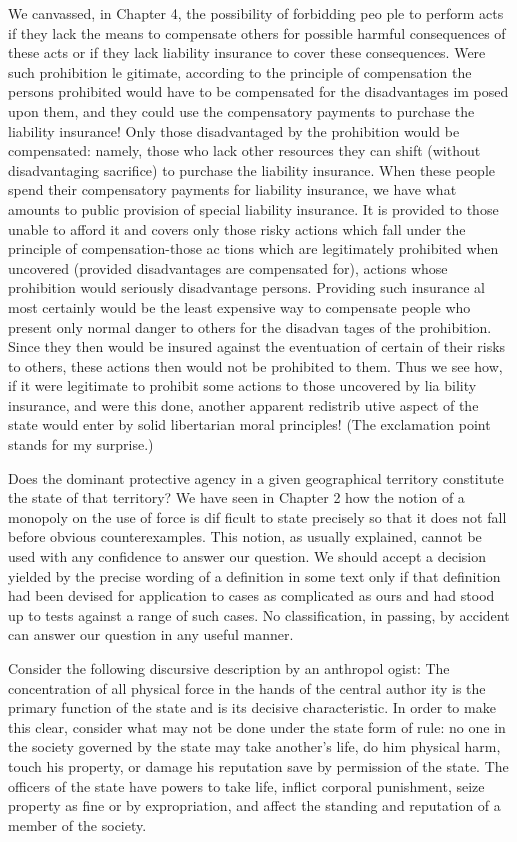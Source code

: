 \documentclass[11pt,openany]{book}
\begin{document}
We canvassed, in Chapter 4, the possibility of forbidding peo ple to perform acts if they lack the means to compensate others for possible harmful consequences of these acts or if they lack liability insurance to cover these consequences. Were such prohibition le gitimate, according to the principle of compensation the persons prohibited would have to be compensated for the disadvantages im posed upon them, and they could use the compensatory payments to purchase the liability insurance! Only those disadvantaged by the prohibition would be compensated: namely, those who lack other resources they can shift (without disadvantaging sacrifice) to purchase the liability insurance. When these people spend their compensatory payments for liability insurance, we have what amounts to public provision of special liability insurance. It is provided to those unable to afford it and covers only those risky actions which fall under the principle of compensation-those ac tions which are legitimately prohibited when uncovered (provided disadvantages are compensated for), actions whose prohibition would seriously disadvantage persons. Providing such insurance al most certainly would be the least expensive way to compensate people who present only normal danger to others for the disadvan tages of the prohibition. Since they then would be insured against the eventuation of certain of their risks to others, these actions then would not be prohibited to them. Thus we see how, if it were legitimate to prohibit some actions to those uncovered by lia bility insurance, and were this done, another apparent redistrib utive aspect of the state would enter by solid libertarian moral principles! (The exclamation point stands for my surprise.) 

Does the dominant protective agency in a given geographical territory constitute the state of that territory? We have seen in Chapter 2 how the notion of a monopoly on the use of force is dif ficult to state precisely so that it does not fall before obvious counterexamples. This notion, as usually explained, cannot be used with any confidence to answer our question. We should accept a decision yielded by the precise wording of a definition in some text only if that definition had been devised for application to cases as complicated as ours and had stood up to tests against a range of such cases. No classification, in passing, by accident can answer our question in any useful manner. 

Consider the following discursive description by an anthropol ogist: The concentration of all physical force in the hands of the central author ity is the primary function of the state and is its decisive characteristic. In order to make this clear, consider what may not be done under the state form of rule: no one in the society governed by the state may take another's life, do him physical harm, touch his property, or damage his reputation save by permission of the state. The officers of the state have powers to take life, inflict corporal punishment, seize property as fine or by expropriation, and affect the standing and reputation of a member of the society. 
\end{document}
